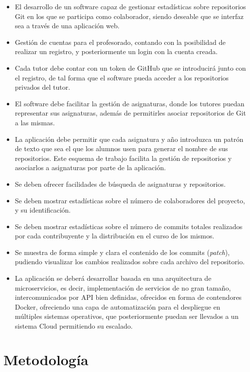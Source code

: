 \begin{itemize}
\item El desarrollo de un software capaz de gestionar estadísticas sobre
  repositorios Git en los que se participa como colaborador, siendo
  deseable que se interfaz sea a través de una aplicación web.
\item Gestión de cuentas para el profesorado, contando con la posibilidad
  de realizar un registro, y posteriormente un login con la cuenta creada.
\item Cada tutor debe contar con un token de GitHub que se introducirá
  junto con el registro, de tal forma que el software pueda acceder a los
  repositorios privados del tutor.
\item El software debe facilitar la gestión de asignaturas, donde los
  tutores puedan representar sus asignaturas, además de permitirles asociar
  repositorios de Git a las mismas.
\item La aplicación debe permitir que cada asignatura y año introduzca un
  patrón de texto que sea el que los alumnos usen para generar el nombre de
  sus repositorios. Este esquema de trabajo facilita la gestión de
  repositorios y asociarlos a asignaturas por parte de la aplicación.
\item Se deben ofrecer facilidades de búsqueda de asignaturas y repositorios.
\item Se deben mostrar estadísticas sobre el número de colaboradores del
  proyecto, y su identificación.
\item Se deben mostrar estadísticas sobre el número de commits totales
  realizados por cada contribuyente y la distribución en el curso de los
  mismos.
\item Se muestra de forma simple y clara el contenido de los commits
  (\emph{patch}), pudiendo visualizar los cambios realizados sobre cada
  archivo del repositorio.
\item La aplicación se deberá desarrollar basada en una arquitectura
  de microservicios, es decir, implementación de servicios de no gran
  tamaño, intercomunicados por API bien definidas, ofrecidos en forma de
  contendores Docker, ofreciendo una capa de automatización para el
  despliegue en múltiples sistemas operativos, que posteriormente puedan
  ser llevados a un sistema Cloud permitiendo su escalado.
\end{itemize}


\section{Metodología}

